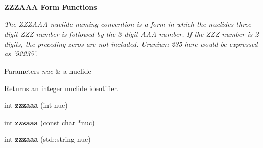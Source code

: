 \begin{Indent}{\bf Z\+Z\+Z\+A\+AA Form Functions}\par
{\em The Z\+Z\+Z\+A\+AA nuclide naming convention is a form in which the nuclides three digit Z\+ZZ number is followed by the 3 digit A\+AA number. If the Z\+ZZ number is 2 digits, the preceding zeros are not included. Uranium-\/235 here would be expressed as ‘92235’. 
\begin{DoxyParams}{Parameters}
{\em nuc} & a nuclide \\
\hline
\end{DoxyParams}
\begin{DoxyReturn}{Returns}
an integer nuclide identifier. 
\end{DoxyReturn}
}\begin{DoxyCompactItemize}
\item 
int {\bfseries zzzaaa} (int nuc)\hypertarget{namespacepyne_1_1nucname_a2f94ab045f7240ac0138fd8c312408ba}{}\label{namespacepyne_1_1nucname_a2f94ab045f7240ac0138fd8c312408ba}

\item 
int {\bfseries zzzaaa} (const char $\ast$nuc)\hypertarget{namespacepyne_1_1nucname_a1f075bc8e768a5cea54b5d0d78df72a8}{}\label{namespacepyne_1_1nucname_a1f075bc8e768a5cea54b5d0d78df72a8}

\item 
int {\bfseries zzzaaa} (std\+::string nuc)\hypertarget{namespacepyne_1_1nucname_aff15f31b4762adb2707c267e9e07b9ac}{}\label{namespacepyne_1_1nucname_aff15f31b4762adb2707c267e9e07b9ac}

\end{DoxyCompactItemize}
\end{Indent}
